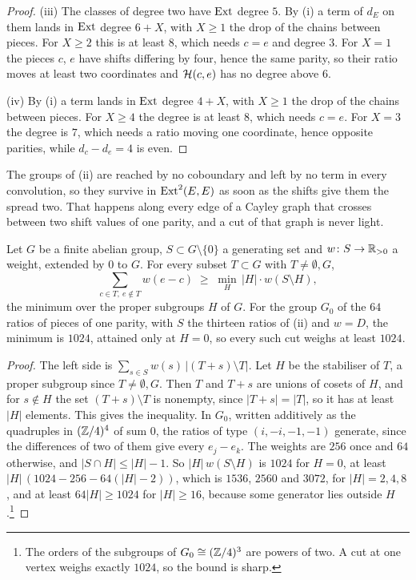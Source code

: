 \begin{proof}
(iii) The classes of degree two have $\operatorname{Ext}$ degree $5$. By (i) a term of $d_{E}$ on them lands
in $\operatorname{Ext}$ degree $6+X$, with $X\ge1$ the drop of the chains between pieces.
For $X\ge2$ this is at least $8$, which needs $c=e$ and degree $3$. For $X=1$
the pieces $c$, $e$ have shifts differing by four, hence the same parity, so
their ratio moves at least two coordinates and $\mathcal{H}(c,e)$ has no degree above
$6$.

(iv) By (i) a term lands in $\operatorname{Ext}$ degree $4+X$, with $X\ge1$ the drop of the
chains between pieces. For $X\ge4$ the degree is at least $8$, which needs
$c=e$. For $X=3$ the degree is $7$, which needs a ratio moving one
coordinate, hence opposite parities, while $d_{c}-d_{e}=4$ is even.
\end{proof}

The groups of (ii) are reached by no coboundary and left by no term in every
convolution, so they survive in $\operatorname{Ext}^{2}(E,E)$ as soon as the shifts give
them the spread two. That happens along every edge of a Cayley graph that
crosses between two shift values of one parity, and a cut of that graph is
never light.

\begin{lemma}\label{lem:cayleycut}
Let $G$ be a finite abelian group, $S\subset G\setminus\{0\}$ a generating
set and $w\colon S\to\mathbb{R}_{>0}$ a weight, extended by $0$ to $G$. For every
subset $T\subset G$ with $T\ne\emptyset,G$,
\[
  \sum_{c\in T,\ e\notin T}w(e-c)\;\ge\;\min_{H}\,|H|\cdot w(S\setminus H),
\]
the minimum over the proper subgroups $H$ of $G$. For the group $G_{0}$ of
the $64$ ratios of pieces of one parity, with $S$ the thirteen ratios of
(ii) and $w=D$, the minimum is $1024$, attained only at
$H=0$, so every such cut weighs at least $1024$.
\end{lemma}

\begin{proof}
The left side is $\sum_{s\in S}w(s)\,|(T+s)\setminus T|$. Let $H$ be the
stabiliser of $T$, a proper subgroup since $T\ne\emptyset,G$. Then $T$ and
$T+s$ are unions of cosets of $H$, and for $s\notin H$ the set
$(T+s)\setminus T$ is nonempty, since $|T+s|=|T|$, so it has at least $|H|$
elements. This gives the inequality. In $G_{0}$, written additively as the
quadruples in $(\mathbb{Z}/4)^{4}$ of sum $0$, the ratios of type $(i,-i,-1,-1)$
generate, since the differences of two of them give every $e_{j}-e_{k}$. The
weights are $256$ once and $64$ otherwise, and $|S\cap H|\le|H|-1$. So
$|H|\,w(S\setminus H)$ is $1024$ for $H=0$, at least
$|H|\,(1024-256-64(|H|-2))$, which is $1536$, $2560$ and $3072$, for
$|H|=2,4,8$, and at least $64|H|\ge1024$ for $|H|\ge16$, because some
generator lies outside $H$.\footnote{The orders of the subgroups of
$G_{0}\cong(\mathbb{Z}/4)^{3}$ are powers of two. A cut at one vertex weighs exactly
$1024$, so the bound is sharp.}
\end{proof}

